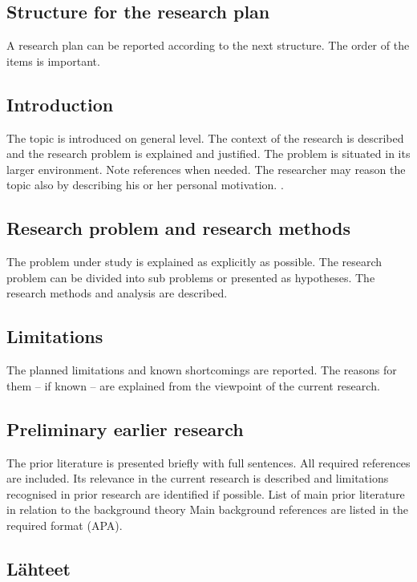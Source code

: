\documentclass[a4paper,12pt]{article}
\begin{document}
\newpage
\begin{appendices}
	
	\section{Structure for the research plan}
	
	A research plan can be reported according to the next structure. The order of the items is 
	important.
	
	\begin{refsection}
		\subsection*{Introduction }
		The topic is introduced on general level. The context of the research is described and the 
		research  problem  is  explained  and  justified.  The  problem  is  situated  in  its  larger 
		environment. Note references when needed. The researcher may reason the topic also by 
		describing his or her personal motivation. \parencite{5418289}.
		\subsection*{Research problem and research methods }
		The problem under study is explained as explicitly as possible. The research problem 
		can be divided into sub problems or presented as hypotheses. The research methods and 
		analysis are described. 
		\subsection*{Limitations}
		The planned limitations and known shortcomings are reported. The reasons for them – if 
		known – are explained from the viewpoint of the current research.
		
		\subsection*{Preliminary earlier research}
		The prior literature is presented briefly with full sentences. All required references are 
		included. Its relevance in the current research is described and limitations recognised in 
		prior research are identified if possible. 
		List of main prior literature in relation to the background theory 
		Main background references are listed in the required format (APA).
		
		\subsection*{Lähteet}
		\printbibliography[heading=none]
	\end{refsection}
	

\end{appendices}
\end{document}
